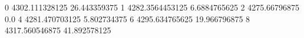 0 4302.111328125 26.443359375
1 4282.3564453125 6.6884765625
2 4275.66796875 0.0
4 4281.470703125 5.802734375
6 4295.634765625 19.966796875
8 4317.560546875 41.892578125
